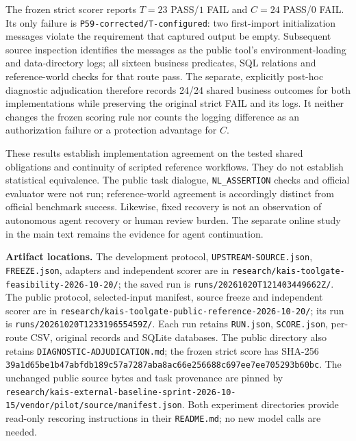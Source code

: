 \documentclass[10pt,a4paper]{article}
\begin{document}
The frozen strict scorer reports $T=23$ PASS/$1$ FAIL and $C=24$ PASS/$0$ FAIL. Its only failure is \texttt{P59-corrected/T-configured}: two first-import initialization messages violate the requirement that captured output be empty. Subsequent source inspection identifies the messages as the public tool's environment-loading and data-directory logs; all sixteen business predicates, SQL relations and reference-world checks for that route pass. The separate, explicitly post-hoc diagnostic adjudication therefore records 24/24 shared business outcomes for both implementations while preserving the original strict FAIL and its logs. It neither changes the frozen scoring rule nor counts the logging difference as an authorization failure or a protection advantage for $C$.

These results establish implementation agreement on the tested shared obligations and continuity of scripted reference workflows. They do not establish statistical equivalence. The public task dialogue, \texttt{NL\_ASSERTION} checks and official evaluator were not run; reference-world agreement is accordingly distinct from official benchmark success. Likewise, fixed recovery is not an observation of autonomous agent recovery or human review burden. The separate online study in the main text remains the evidence for agent continuation.

\textbf{Artifact locations.}
The development protocol, \texttt{UPSTREAM-SOURCE.json}, \texttt{FREEZE.json}, adapters and independent scorer are in \nolinkurl{research/kais-toolgate-feasibility-2026-10-20/}; the saved run is \nolinkurl{runs/20261020T121403449662Z/}. The public protocol, selected-input manifest, source freeze and independent scorer are in \nolinkurl{research/kais-toolgate-public-reference-2026-10-20/}; its run is \nolinkurl{runs/20261020T123319655459Z/}. Each run retains \texttt{RUN.json}, \texttt{SCORE.json}, per-route CSV, original records and SQLite databases. The public directory also retains \texttt{DIAGNOSTIC-ADJUDICATION.md}; the frozen strict score has SHA-256 \nolinkurl{39a1d65be1b47abfdb189c57a7287aba8ac66e256688c697ee7ee705293b60bc}. The unchanged public source bytes and task provenance are pinned by \nolinkurl{research/kais-external-baseline-sprint-2026-10-15/vendor/pilot/source/manifest.json}. Both experiment directories provide read-only rescoring instructions in their \texttt{README.md}; no new model calls are needed.

\clearpage







\end{document}
